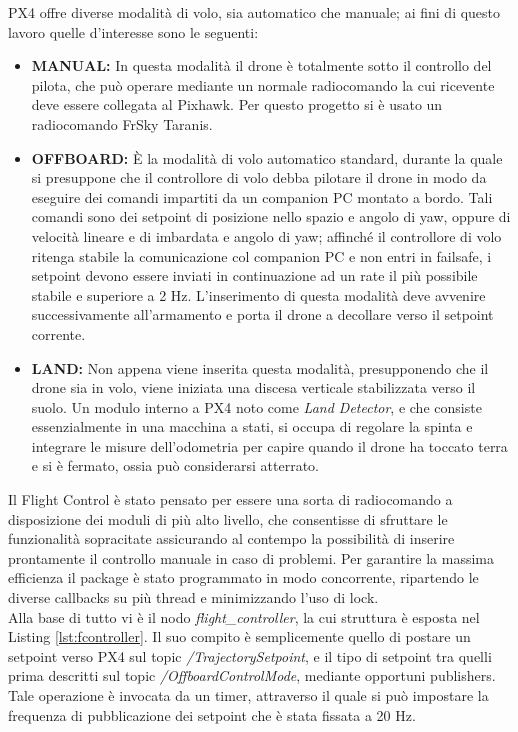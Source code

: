 PX4 offre diverse modalità di volo, sia automatico che manuale; ai fini di questo lavoro quelle d'interesse sono le seguenti:
\begin{itemize}
    \item \textbf{MANUAL:} In questa modalità il drone è totalmente sotto il controllo del pilota, che può operare mediante un normale radiocomando la cui ricevente deve essere collegata al Pixhawk. Per questo progetto si è usato un radiocomando FrSky Taranis.
    \item \textbf{OFFBOARD:} È la modalità di volo automatico standard, durante la quale si presuppone che il controllore di volo debba pilotare il drone in modo da eseguire dei comandi impartiti da un companion PC montato a bordo. Tali comandi sono dei setpoint di posizione nello spazio e angolo di yaw, oppure di velocità lineare e di imbardata e angolo di yaw; affinché il controllore di volo ritenga stabile la comunicazione col companion PC e non entri in failsafe, i setpoint devono essere inviati in continuazione ad un rate il più possibile stabile e superiore a 2 Hz. L'inserimento di questa modalità deve avvenire successivamente all'armamento e porta il drone a decollare verso il setpoint corrente.
    \item \textbf{LAND:} Non appena viene inserita questa modalità, presupponendo che il drone sia in volo, viene iniziata una discesa verticale stabilizzata verso il suolo. Un modulo interno a PX4 noto come \emph{Land Detector}, e che consiste essenzialmente in una macchina a stati, si occupa di regolare la spinta e integrare le misure dell'odometria per capire quando il drone ha toccato terra e si è fermato, ossia può considerarsi atterrato.
\end{itemize}
Il Flight Control è stato pensato per essere una sorta di radiocomando a disposizione dei moduli di più alto livello, che consentisse di sfruttare le funzionalità sopracitate assicurando al contempo la possibilità di inserire prontamente il controllo manuale in caso di problemi. Per garantire la massima efficienza il package è stato programmato in modo concorrente, ripartendo le diverse callbacks su più thread e minimizzando l'uso di lock.\\
Alla base di tutto vi è il nodo \emph{flight\_controller}, la cui struttura è esposta nel Listing \ref{lst:fcontroller}. Il suo compito è semplicemente quello di postare un setpoint verso PX4 sul topic \emph{/TrajectorySetpoint}, e il tipo di setpoint tra quelli prima descritti sul topic \emph{/OffboardControlMode}, mediante opportuni publishers. Tale operazione è invocata da un timer, attraverso il quale si può impostare la frequenza di pubblicazione dei setpoint che è stata fissata a 20 Hz.\\
